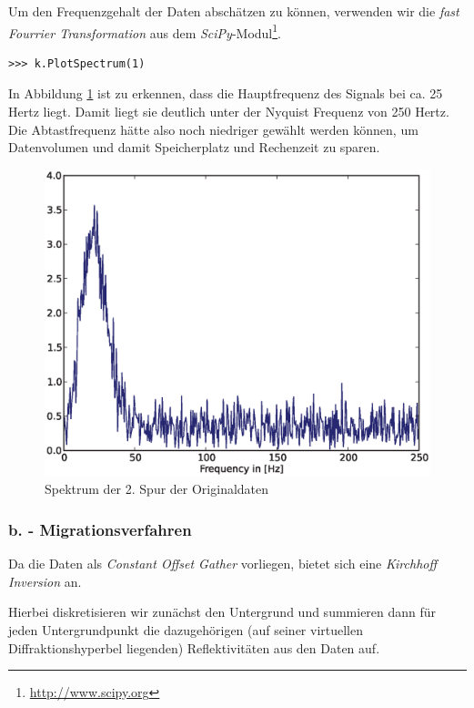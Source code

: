 \documentclass[12pt,a4paper]{scrartcl}
\begin{document}
Um den Frequenzgehalt der Daten abschätzen zu können, verwenden wir die \textit{fast Fourrier Transformation} aus dem \textit{SciPy}-Modul\footnote{\url{http://www.scipy.org}}.

\begin{verbatim}
>>> k.PlotSpectrum(1)
\end{verbatim}

In Abbildung \ref{spectrum} ist zu erkennen, dass die Hauptfrequenz des Signals bei ca. 25 Hertz liegt. 
Damit liegt sie deutlich unter der Nyquist Frequenz von 250 Hertz. Die Abtastfrequenz hätte also noch niedriger gewählt werden können, um Datenvolumen und damit Speicherplatz und Rechenzeit zu sparen.

\begin{figure}[htb]
\centering
\includegraphics[width=1\textwidth]{spectrum}
\caption{Spektrum der 2. Spur der Originaldaten}
\label{spectrum}
\end{figure}



\subsubsection*{b. - Migrationsverfahren}

Da die Daten als \textit{Constant Offset Gather} vorliegen, bietet sich eine \textit{Kirchhoff Inversion} an. 

Hierbei diskretisieren wir zunächst den Untergrund und summieren dann für jeden Untergrundpunkt die dazugehörigen (auf seiner virtuellen Diffraktionshyperbel liegenden) Reflektivitäten aus den Daten auf. 
\end{document}
